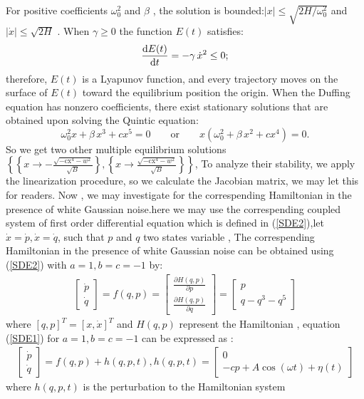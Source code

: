 \documentclass{ws-ijbc}
\begin{document}
For positive coefficients $\omega_0^2$ and $\beta$ , the solution is bounded:$|x| \le \sqrt{2H/\omega_0^2}$ and $|\dot{x}| \le \sqrt{2H}$ . When $\gamma \geq 0$ the function $E(t)$ satisfies:
\begin{equation*}
\frac{{\text d}E(t)}{{\text d}t} = - \gamma\,\dot{x}^2 \le 0;
\end{equation*}
therefore, $E(t)$ is a Lyapunov function, and every trajectory moves on the surface of $E(t)$ toward the equilibrium position the origin. When the Duffing equation has nonzero coefficients, there exist stationary solutions that are obtained upon solving the Quintic  equation:
\begin{equation}
    \omega_0^2 x + \beta\,x^3 +cx^5=0 \qquad \mbox{or} \qquad x \left( \omega_0^2 + 
\beta\,x^2 +cx^4\right) =0 .
\end{equation}
So we get two other multiple equilibrium solutions
$\left\{\left\{x\to -\frac{\sqrt{-\text{cx}^4-w^2}}{\sqrt{B}}\right\},\left\{x\to \frac{\sqrt{-\text{cx}^4-w^2}}{\sqrt{B}}\right\}\right\}$, To analyze their stability, we apply the linearization procedure, so we calculate the Jacobian matrix, we may let this for readers.
Now , we may investigate for the correspending Hamiltonian  in the presence of white Gaussian noise.here we may use the correspending coupled system of first order differential equation which is defined in (\ref{SDE2}),let $\dot{x}=\dot{p},\dot{x}=\dot{q}$, such that $p$ and $q$ two states variable , The correspending Hamiltonian in the presence of white Gaussian noise can be obtained using  (\ref{SDE2}) with $a=1,b=c=-1$ by:
\begin{align}
\begin{bmatrix} \dot{p} \\ \dot{q}\end{bmatrix} = f(q,p)= \begin{bmatrix} \frac{\partial H(q,p)}{\partial p }\\\frac{\partial H(q,p)}{\partial q }  \end{bmatrix} = \begin{bmatrix} p\\ q-q^3-q^5\end{bmatrix}
\end{align}
where $[q,p]^{T}=[x,\dot{x}]^{T}$ and $H(q,p)$ represent the Hamiltonian
\cite{Holmes79}, equation (\ref{SDE1}) for $a=1,b=c=-1$ can be expressed as :
\begin{align}
\begin{bmatrix} \dot{p} \\ \dot{q}\end{bmatrix} = f(q,p)+h(q,p,t),h(q,p,t)= \begin{bmatrix} 0\\  -cp +A \cos(\omega t)+\eta(t)  \end{bmatrix} 
\end{align}
where $h(q,p,t)$ is the perturbation to the Hamiltonian system 
\end{document}
